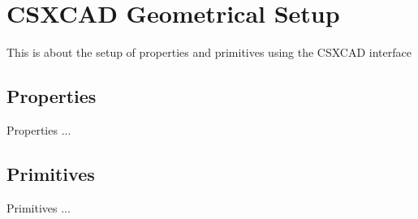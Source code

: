 \chapter{CSXCAD Geometrical Setup}\label{chap-CSXCAD}
	This is about the setup of properties and primitives using the CSXCAD interface

\section{Properties}\label{sect-Properties}
Properties ...

\section{Primitives}\label{sect-Primitives}
Primitives ...

